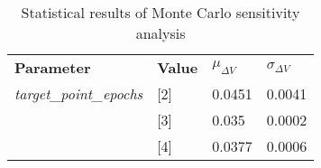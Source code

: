 
                    \begin{table}[]
                    \centering
                    \begin{tabular}{l l l l}
                    \rowcolor[HTML]{EFEFEF} \textbf{Parameter} & \textbf{Value} & \textbf{$\mu_{\Delta V}$} & \textbf{$\sigma_{\Delta V}$} \\
                    \textit{target\_point\_epochs} & [2] & 0.0451 & 0.0041 \\
 & [3] & 0.035 & 0.0002 \\
 & [4] & 0.0377 & 0.0006 \\

                    \end{tabular}
                    \caption{Statistical results of Monte Carlo sensitivity analysis}
                    \label{tab:SensitivityAnalysis}
                    \end{table}
                    